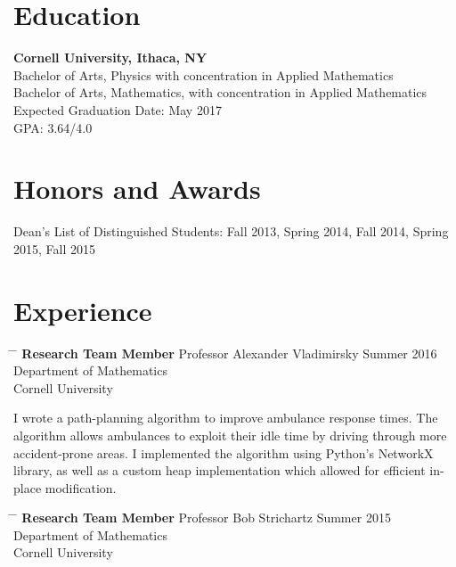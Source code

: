 \documentclass[12pt]{res}
\begin{document}
\begin{resume}
  \section{Education}

	\noindent
    {\bf Cornell University, Ithaca, NY}\\
    Bachelor of Arts, Physics with concentration in Applied Mathematics\\
    Bachelor of Arts, Mathematics, with concentration in Applied Mathematics\\
    Expected Graduation Date: May 2017 \\
    GPA: 3.64/4.0

  \section{Honors and Awards}
	\noindent
    Dean's List of Distinguished Students: Fall 2013, Spring 2014, Fall 2014, Spring 2015, Fall 2015\\

  \vspace{-10pt}
  \section{Experience}
    
    \vspace{5pt}
    \begin{tabbing}
      \hspace{2.3in} \= \hspace{2.6in} \= \kill
      {\bf Research Team Member} \> Professor Alexander Vladimirsky  \> Summer 2016 \\
		\> Department of Mathematics\\
		\> Cornell University \\
    \end{tabbing}\vspace{-30pt}	

	\noindent
	I wrote a path-planning algorithm to improve ambulance response times.
	The algorithm allows ambulances to exploit their idle time by
driving through more accident-prone areas.
	I implemented the algorithm using Python's NetworkX library,
as well as a custom heap implementation which allowed for
efficient in-place modification.
    
    \vspace{5pt}
    \begin{tabbing}
      \hspace{2.3in} \= \hspace{2.6in} \= \kill
      {\bf Research Team Member} \> Professor Bob Strichartz  \> Summer 2015 \\
		\> Department of Mathematics\\
		\> Cornell University \\
    \end{tabbing}\vspace{-30pt}	


\end{resume}
\end{document}
